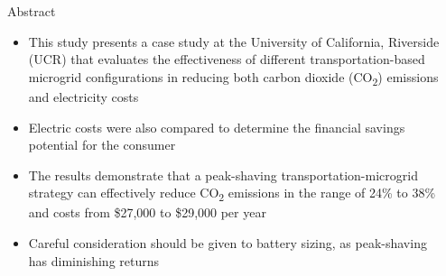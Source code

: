 \documentclass[final, 36 pt]{beamer}
\newlength{\sepwid}
\newlength{\onecolwid}
\begin{document}
\begin{frame}[t] %

\begin{columns}[t] %

\begin{column}{\sepwid}\end{column} %

\begin{column}{\onecolwid} %

\begin{alertblock}{Abstract}
	\begin{itemize}
		\item This study presents a case study at the University of California, Riverside (UCR) that evaluates the effectiveness of different transportation-based microgrid configurations in reducing both carbon dioxide (CO\textsubscript{2}) emissions and electricity costs
		\item Electric costs were also compared to determine the financial savings potential for the consumer
		\item The results demonstrate that a peak-shaving transportation-microgrid strategy can effectively reduce CO\textsubscript{2} emissions in the range of 24\% to 38\% and costs from \$27,000 to \$29,000 per year
		\item  Careful consideration should be given to battery sizing, as peak-shaving has diminishing returns
	\end{itemize}

\end{alertblock}
\end{column}
\end{columns}
\end{frame}
\end{document}
